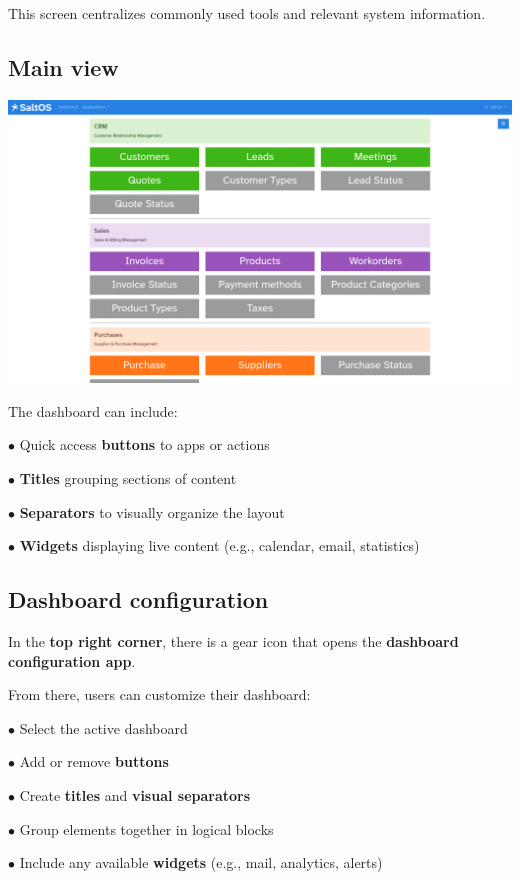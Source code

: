 \documentclass[a4paper]{article}
\begin{document}
This screen centralizes commonly used tools and relevant system information.

\hypertarget{toc83}{}
\subsection{Main view}

\begin{center}\includegraphics[width=1\textwidth]{../ujest/snaps/test-screenshots-js-screenshots-dashboard-dashboard-en-us-1-snap.png}\end{center}

The dashboard can include:

\begin{compactitem}
\item[\color{myblue}$\bullet$] Quick access \textbf{buttons} to apps or actions
\item[\color{myblue}$\bullet$] \textbf{Titles} grouping sections of content
\item[\color{myblue}$\bullet$] \textbf{Separators} to visually organize the layout
\item[\color{myblue}$\bullet$] \textbf{Widgets} displaying live content (e.g., calendar, email, statistics)
\end{compactitem}

\hypertarget{toc84}{}
\subsection{Dashboard configuration}

In the \textbf{top right corner}, there is a gear icon that opens the \textbf{dashboard configuration app}.

From there, users can customize their dashboard:

\begin{compactitem}
\item[\color{myblue}$\bullet$] Select the active dashboard
\item[\color{myblue}$\bullet$] Add or remove \textbf{buttons}
\item[\color{myblue}$\bullet$] Create \textbf{titles} and \textbf{visual separators}
\item[\color{myblue}$\bullet$] Group elements together in logical blocks
\item[\color{myblue}$\bullet$] Include any available \textbf{widgets} (e.g., mail, analytics, alerts)
\end{compactitem}
\end{document}
